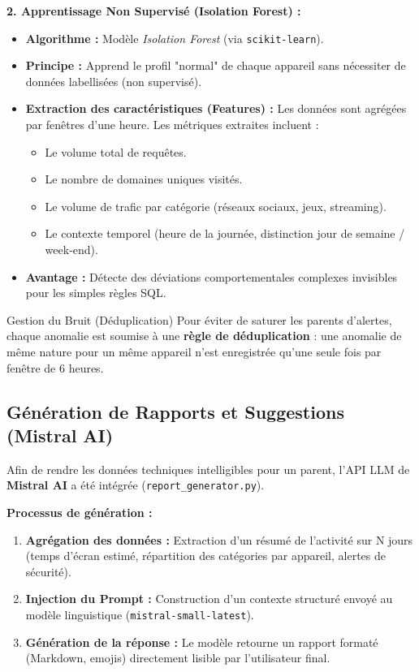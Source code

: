 \documentclass[11pt,a4paper]{article}
\begin{document}
\textbf{2. Apprentissage Non Supervisé (Isolation Forest) :}
\begin{itemize}
    \item \textbf{Algorithme :} Modèle \textit{Isolation Forest} (via \texttt{scikit-learn}).
    \item \textbf{Principe :} Apprend le profil "normal" de chaque appareil sans nécessiter de données labellisées (non supervisé).
    \item \textbf{Extraction des caractéristiques (Features) :} Les données sont agrégées par fenêtres d'une heure. Les métriques extraites incluent :
    \begin{itemize}
        \item Le volume total de requêtes.
        \item Le nombre de domaines uniques visités.
        \item Le volume de trafic par catégorie (réseaux sociaux, jeux, streaming).
        \item Le contexte temporel (heure de la journée, distinction jour de semaine / week-end).
    \end{itemize}
    \item \textbf{Avantage :} Détecte des déviations comportementales complexes invisibles pour les simples règles SQL.
\end{itemize}

\begin{probcadre}{Gestion du Bruit (Déduplication)}
Pour éviter de saturer les parents d'alertes, chaque anomalie est soumise à une \textbf{règle de déduplication} : une anomalie de même nature pour un même appareil n'est enregistrée qu'une seule fois par fenêtre de 6 heures.
\end{probcadre}

\subsection{Génération de Rapports et Suggestions (Mistral AI)}
Afin de rendre les données techniques intelligibles pour un parent, l'API LLM de \textbf{Mistral AI} a été intégrée (\texttt{report\_generator.py}).

\textbf{Processus de génération :}
\begin{enumerate}
    \item \textbf{Agrégation des données :} Extraction d'un résumé de l'activité sur N jours (temps d'écran estimé, répartition des catégories par appareil, alertes de sécurité).
    \item \textbf{Injection du Prompt :} Construction d'un contexte structuré envoyé au modèle linguistique (\texttt{mistral-small-latest}).
    \item \textbf{Génération de la réponse :} Le modèle retourne un rapport formaté (Markdown, emojis) directement lisible par l'utilisateur final.
\end{enumerate}
\end{document}
